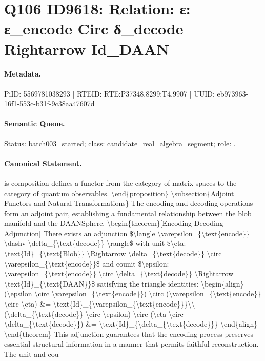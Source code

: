 \section*{Q106 ID9618: Relation: ε: ε\_encode Circ δ\_decode Rightarrow Id\_DAAN}
\paragraph{Metadata.}
PiID: 5569781038293 | RTEID: RTE:P37348.8299:T4.9907 | UUID: eb973963-16f1-553c-b31f-9c38aa47607d

\paragraph{Semantic Queue.}
Status: batch003\_started; class: candidate\_real\_algebra\_segment; role: .

\paragraph{Canonical Statement.}
is composition defines a functor from the category of matrix spaces to the category of quantum observables. \textbackslash{}end\{proposition\} \textbackslash{}subsection\{Adjoint Functors and Natural Transformations\} The encoding and decoding operations form an adjoint pair, establishing a fundamental relationship between the blob manifold and the DAANSphere. \textbackslash{}begin\{theorem\}[Encoding-Decoding Adjunction] There exists an adjunction \$\textbackslash{}langle \textbackslash{}varepsilon\_\{\textbackslash{}text\{encode\}\} \textbackslash{}dashv \textbackslash{}delta\_\{\textbackslash{}text\{decode\}\} \textbackslash{}rangle\$ with unit \$\textbackslash{}eta: \textbackslash{}text\{Id\}\_\{\textbackslash{}text\{Blob\}\} \textbackslash{}Rightarrow \textbackslash{}delta\_\{\textbackslash{}text\{decode\}\} \textbackslash{}circ \textbackslash{}varepsilon\_\{\textbackslash{}text\{encode\}\}\$ and counit \$\textbackslash{}epsilon: \textbackslash{}varepsilon\_\{\textbackslash{}text\{encode\}\} \textbackslash{}circ \textbackslash{}delta\_\{\textbackslash{}text\{decode\}\} \textbackslash{}Rightarrow \textbackslash{}text\{Id\}\_\{\textbackslash{}text\{DAAN\}\}\$ satisfying the triangle identities: \textbackslash{}begin\{align\} (\textbackslash{}epsilon \textbackslash{}circ \textbackslash{}varepsilon\_\{\textbackslash{}text\{encode\}\}) \textbackslash{}circ (\textbackslash{}varepsilon\_\{\textbackslash{}text\{encode\}\} \textbackslash{}circ \textbackslash{}eta) \&= \textbackslash{}text\{Id\}\_\{\textbackslash{}varepsilon\_\{\textbackslash{}text\{encode\}\}\}\textbackslash{}\textbackslash{} (\textbackslash{}delta\_\{\textbackslash{}text\{decode\}\} \textbackslash{}circ \textbackslash{}epsilon) \textbackslash{}circ (\textbackslash{}eta \textbackslash{}circ \textbackslash{}delta\_\{\textbackslash{}text\{decode\}\}) \&= \textbackslash{}text\{Id\}\_\{\textbackslash{}delta\_\{\textbackslash{}text\{decode\}\}\} \textbackslash{}end\{align\} \textbackslash{}end\{theorem\} This adjunction guarantees that the encoding process preserves essential structural information in a manner that permits faithful reconstruction. The unit and cou

